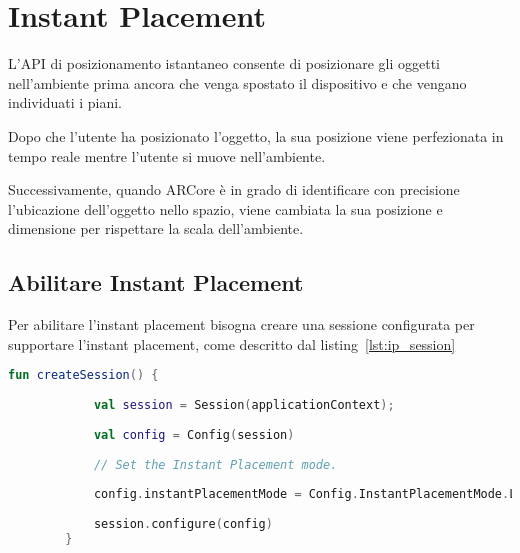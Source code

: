 \documentclass[crop=false, class=book]{standalone}
\begin{document}
	\chapter{Instant Placement}
	L'API di posizionamento istantaneo consente di posizionare gli oggetti nell’ambiente prima ancora che venga spostato il dispositivo e che vengano individuati i piani.
	
	Dopo che l’utente ha posizionato l’oggetto, la sua posizione viene perfezionata in tempo reale mentre l’utente si muove nell’ambiente.
	
	Successivamente, quando ARCore è in grado di identificare con precisione l’ubicazione dell’oggetto nello spazio, viene cambiata la sua posizione e dimensione per rispettare la scala dell’ambiente.
	
	\section{Abilitare Instant Placement}
	Per abilitare l’instant placement bisogna creare una sessione configurata per supportare l’instant placement, come descritto dal listing~\vref{lst:ip_session}
		
	\begin{center}
		\begin{minipage}{0.95\textwidth}
		\begin{lstlisting}[caption={Descrizione del listing.}, label={lst:ip_session}, language=Kotlin]
		fun createSession() {
		
			val session = Session(applicationContext);
			
			val config = Config(session)
			
			// Set the Instant Placement mode.
			
			config.instantPlacementMode = Config.InstantPlacementMode.LOCAL_Y_UP
			
			session.configure(config)
		}
		\end{lstlisting}
		\end{minipage}
	\end{center}
\end{document}

